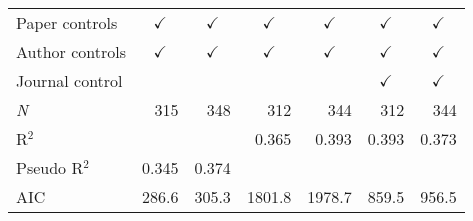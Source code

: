 {\begin{tabular}{l*{6}{D{.}{.}{-1}}}
Paper controls      	&         	&         	&         	&         	&         	&         \\
\addlinespace
Author controls     	&         	&         	&         	&         	&         	&         \\
\addlinespace
Journal control     	&                        	&                        	&                        	&                        	&         	&         \\
\midrule
\textit{N}          	&            315         	&            348         	&            312         	&            344         	&            312         	&            344         \\
R$^{2}$             	&                        	&                        	&          0.365         	&          0.393         	&          0.393         	&          0.373         \\
Pseudo R$^{2}$      	&          0.345         	&          0.374         	&                        	&                        	&                        	&                        \\
AIC                 	&          286.6         	&          305.3         	&         1801.8         	&         1978.7         	&          859.5         	&          956.5         \\
\bottomrule
\end{tabular}
}
